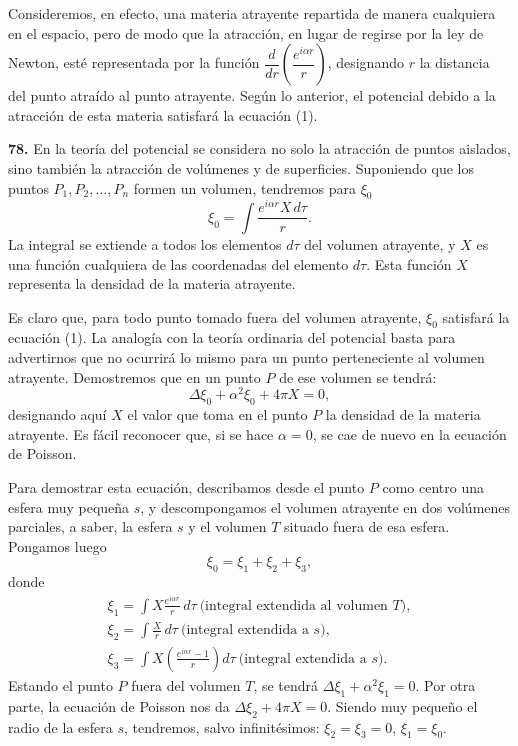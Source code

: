 Consideremos, en efecto, una materia atrayente repartida de manera
cualquiera en el espacio, pero de modo que la atracción, en lugar de regirse
por la ley de Newton, esté representada por la función
$\dfrac{d}{dr}\!\left(\dfrac{e^{i\alpha r}}{r}\right)$, designando $r$ la
distancia del punto atraído al punto atrayente. Según lo anterior, el
potencial debido a la atracción de esta materia satisfará la ecuación (1).

\noindent\textbf{78.} En la teoría del potencial se considera no solo la
atracción de puntos aislados, sino también la atracción de volúmenes y de
superficies. Suponiendo que los puntos $P_1,P_2,\dots,P_n$ formen un
volumen, tendremos para $\xi_0$
\begin{equation}
\xi_0 = \int \frac{e^{i\alpha r}X\,d\tau}{r}.
\tag{5}
\end{equation}
La integral se extiende a todos los elementos $d\tau$ del volumen
atrayente, y $X$ es una función cualquiera de las coordenadas del elemento
$d\tau$. Esta función $X$ representa la densidad de la materia atrayente.

Es claro que, para todo punto tomado fuera del volumen atrayente, $\xi_0$
satisfará la ecuación (1). La analogía con la teoría ordinaria del
potencial basta para advertirnos que no ocurrirá lo mismo para un punto
perteneciente al volumen atrayente. Demostremos que en un punto $P$ de ese
volumen se tendrá:
\begin{equation}
\Delta\xi_0+\alpha^2\xi_0+4\pi X=0,
\tag{6}
\end{equation}
designando aquí $X$ el valor que toma en el punto $P$ la densidad de la
materia atrayente. Es fácil reconocer que, si se hace $\alpha=0$, se cae
de nuevo en la ecuación de Poisson.

Para demostrar esta ecuación, describamos desde el punto $P$ como centro
una esfera muy pequeña $s$, y descompongamos el volumen atrayente en dos
volúmenes parciales, a saber, la esfera $s$ y el volumen $T$ situado fuera
de esa esfera. Pongamos luego
\[
\xi_0=\xi_1+\xi_2+\xi_3,
\]
donde
\begin{gather*}
\xi_1=\int X\frac{e^{i\alpha r}}{r}\,d\tau\ \text{(integral extendida al
volumen $T$)},\\
\xi_2=\int \frac{X}{r}\,d\tau\ \text{(integral extendida a $s$)},\\
\xi_3=\int X\left(\frac{e^{i\alpha r}-1}{r}\right)d\tau\ \text{(integral
extendida a $s$)}.
\end{gather*}
Estando el punto $P$ fuera del volumen $T$, se tendrá
$\Delta\xi_1+\alpha^2\xi_1=0$. Por otra parte, la ecuación de Poisson nos
da $\Delta\xi_2+4\pi X=0$. Siendo muy pequeño el radio de la esfera $s$,
tendremos, salvo infinitésimos: $\xi_2=\xi_3=0$, $\xi_1=\xi_0$.

